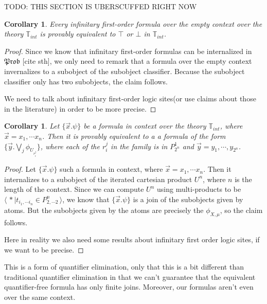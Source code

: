 \documentclass[a4paper]{amsproc}
\theoremstyle{plain}
\newtheorem{corollary}[theorem]{Corollary}
\theoremstyle{definition}
\theoremstyle{remark}
\numberwithin{equation}{section}
\DeclareMathOperator{\Sh}{Sh}
\newcommand{\Set}{\textup{\textsf{Set}}}
\newcommand{\Prob}{\mathfrak{Prob}}
\newcommand{\la}{\langle\,}
\newcommand{\ra}{\,\rangle}
\begin{document}
TODO: THIS SECTION IS UBERSCUFFED RIGHT NOW
\begin{corollary}
Every infinitary first-order formula over the empty context over the theory $\mathbb{T}_{int}$ is provably equivalent to $\top$ or $\bot$ in $\mathbb{T}_{int}$.
\end{corollary}
\begin{proof}
    Since we know that infinitary first-order formulas can be internalized in $\Prob$ [cite sth], we only need to remark that a formula over the empty context invernalizes to a subobject of the subobject classifier. Because the subobject classifier only has two subobjects, the claim follows.

    We need to talk about infinitary first-order logic sites(or use claims about those in the literature) in order to be more precise.
\end{proof}

\begin{corollary}
    Let $\{ \vec{x} . \psi\}$ be a formula in context over the theory $\mathbb{T}_{int}$, where $\vec{x} = x_1, \cdots x_n$. Then it is provably equivalent to a a formula of the form $\{\vec{y} . \bigvee_j \phi_{U_{r_i^j}} \}$, where each of the $r_i^j$ in the family is in $P^1_{2^n}$ and $\vec{y} = y_1,\cdots,y_{2^n}$.
\end{corollary}
\begin{proof}
    Let $\{ \vec{x} . \psi\}$ such a formula in context, where $\vec{x} = x_1, \cdots x_n$. Then it internalizes to a subobject of the iterated cartesian product $U^n$, where $n$ is the length of the context. Since we can compute $U^n$ using multi-products to be $\la * \mid t_{i_1,\cdots i_n} \in P^n_{2,\cdots 2} \ra$, we know that $\{ \vec{x} . \psi\}$ is a join of the subobjects given by atoms. But the subobjects given by the atoms are precisely the $\phi_{X,\mu}$, so the claim follows.

    Here in reality we also need some results about infinitary first order logic sites, if we want to be precise.
\end{proof}

This is a form of quantifier elimination, only that this is a bit different than traditional quantifier elimination in that we can't guarantee that the equivalent quantifier-free formula has only finite joins. Moreover, our formulas aren't even over the same context.
\end{document}
